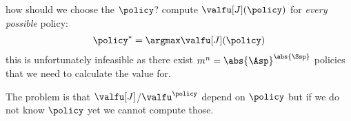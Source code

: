 \begin{sectionbox}\nospacing
   how should we choose the $\policy$?
   compute $\valfu[J](\policy)$ for \textit{every possible} policy:
  \begin{align}
    \policy^{*}=\argmax\valfu[J](\policy)
  \end{align}
   this is unfortunately infeasible as there exist $m^{n}=\abs{\Asp}^{\abs{\Ssp}}$ policies that
  we need to calculate the value for.
\end{sectionbox}
\begin{notebox}[Note]\nospacing
  The problem is that $\valfu[J]$/$\valfu^{\policy}$ depend on $\policy$ but if we do not know $\policy$ yet we cannot compute those.
\end{notebox}
